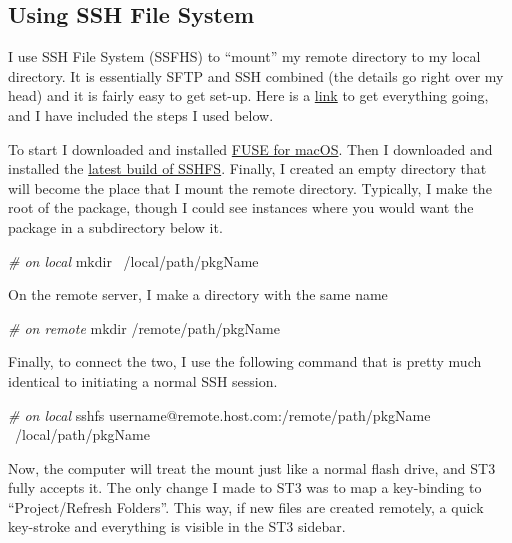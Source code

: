 \documentclass[]{book}
\newenvironment{Shaded}{\begin{snugshade}}{\end{snugshade}}
\newcommand{\CommentTok}[1]{\textcolor[rgb]{0.56,0.35,0.01}{\textit{#1}}}
\newcommand{\FunctionTok}[1]{\textcolor[rgb]{0.00,0.00,0.00}{#1}}
\newcommand{\ExtensionTok}[1]{#1}
\newcommand{\NormalTok}[1]{#1}
\begin{document}
\subsection{Using SSH File System}\label{using-ssh-file-system}

I use SSH File System (SSFHS) to ``mount'' my remote directory to my
local directory. It is essentially SFTP and SSH combined (the details go
right over my head) and it is fairly easy to get set-up. Here is a
\href{https://github.com/osxfuse/osxfuse/wiki/SSHFS}{link} to get
everything going, and I have included the steps I used below.

To start I downloaded and installed
\href{https://osxfuse.github.io}{FUSE for macOS}. Then I downloaded and
installed the \href{https://github.com/osxfuse/sshfs/releases}{latest
build of SSHFS}. Finally, I created an empty directory that will become
the place that I mount the remote directory. Typically, I make the root
of the package, though I could see instances where you would want the
package in a subdirectory below it.

\begin{Shaded}
\begin{Highlighting}[]
\CommentTok{# on local}
\FunctionTok{mkdir}\NormalTok{ ~/local/path/pkgName}
\end{Highlighting}
\end{Shaded}

On the remote server, I make a directory with the same name

\begin{Shaded}
\begin{Highlighting}[]
\CommentTok{# on remote}
\FunctionTok{mkdir}\NormalTok{ /remote/path/pkgName}
\end{Highlighting}
\end{Shaded}

Finally, to connect the two, I use the following command that is pretty
much identical to initiating a normal SSH session.

\begin{Shaded}
\begin{Highlighting}[]
\CommentTok{# on local}
\ExtensionTok{sshfs}\NormalTok{ username@remote.host.com:/remote/path/pkgName ~/local/path/pkgName}
\end{Highlighting}
\end{Shaded}

Now, the computer will treat the mount just like a normal flash drive,
and ST3 fully accepts it. The only change I made to ST3 was to map a
key-binding to ``Project/Refresh Folders''. This way, if new files are
created remotely, a quick key-stroke and everything is visible in the
ST3 sidebar.
\end{document}
